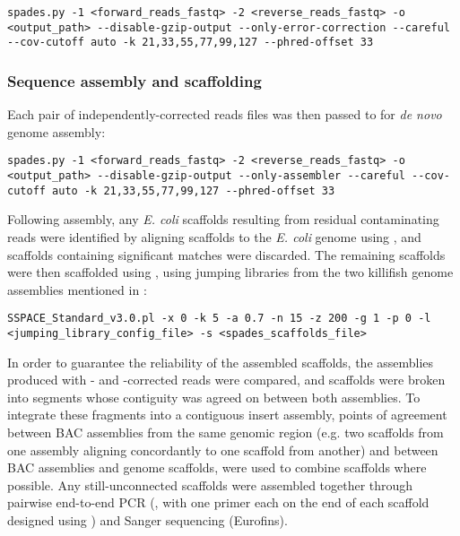\begin{lstlisting}
spades.py -1 <forward_reads_fastq> -2 <reverse_reads_fastq> -o <output_path> --disable-gzip-output --only-error-correction --careful --cov-cutoff auto -k 21,33,55,77,99,127 --phred-offset 33
\end{lstlisting}

\subsubsection{Sequence assembly and scaffolding}
\label{sec:methods_comp_bacs_assembly}

Each pair of independently-corrected reads files was then passed to  \parencite{bankevich2012spades} for \textit{de novo} genome assembly:

\begin{lstlisting}
spades.py -1 <forward_reads_fastq> -2 <reverse_reads_fastq> -o <output_path> --disable-gzip-output --only-assembler --careful --cov-cutoff auto -k 21,33,55,77,99,127 --phred-offset 33
\end{lstlisting}

Following assembly, any \textit{E. coli} scaffolds resulting from residual contaminating reads were identified by aligning scaffolds to the \textit{E. coli} genome using  \parencite{altschul1990blast,altschul1997blast}, and scaffolds containing significant matches were discarded. The remaining scaffolds were then scaffolded using  \parencite{boetzer2011sspace}, using jumping libraries from the two killifish genome assemblies mentioned in  \parencite{valenzano2015genome,reichwald2015genome}:

\begin{lstlisting}
SSPACE_Standard_v3.0.pl -x 0 -k 5 -a 0.7 -n 15 -z 200 -g 1 -p 0 -l <jumping_library_config_file> -s <spades_scaffolds_file>
\end{lstlisting}

In order to guarantee the reliability of the assembled scaffolds, the assemblies produced with - and -corrected reads were compared, and scaffolds were broken into segments whose contiguity was agreed on between both assemblies. To integrate these fragments into a contiguous insert assembly, points of agreement between BAC assemblies from the same genomic region (e.g. two scaffolds from one assembly aligning concordantly to one scaffold from another) and between BAC assemblies and genome scaffolds, were used to combine scaffolds where possible. Any still-unconnected scaffolds were assembled together through pairwise end-to-end PCR (, with one primer each on the end of each scaffold designed using  \parencite{untergasser2012primer3}) and Sanger sequencing (Eurofins).

